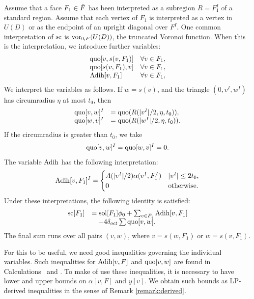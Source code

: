 Assume that a face $F_1\in \tildeF$ has been interpreted as a
subregion $R=F_1^I$ of a standard region.  Assume that each vertex
of $F_1$ is interpreted as a vertex in $U(D)$ or as the endpoint
of an upright diagonal over $F^I$.  One common interpretation of
$\sc$ is $\vor_{0,F}(U(D))$, the truncated Voronoi function. When
this is the interpretation, we introduce further variables:
    $$
    \begin{array}{lll}
    \quo[v,s(v,F_1)] & \forall v\in F_1,\\
    \quo[s(v,F_1),v] & \forall v\in F_1,\\
    \Adih[v,F_1] & \forall v\in F_1,\\
    \end{array}
    $$
We interpret the variables as follows. If $w = s(v)$, and the
triangle $(0,v^I,w^I)$ has circumradius $\eta$ at most $t_0$, then
    $$
    \begin{array}{lll}
    \quo[v,w]^I &= \quo(R(|v^I|/2,\eta,t_0)),\\
    \quo[w,v]^I &= \quo(R(|w^I|/2,\eta,t_0)).
    \end{array}
    $$
If the circumradius is greater than $t_0$, we take
    $$\quo[v,w]^I =\quo[w,v]^I =0.$$
The variable $\Adih$ has the following interpretation:
    $$\Adih[v,F_1]^I = \begin{cases}
        A(|v^I|/2)\alpha(v^I,F_1^I) & |v^I|\le 2t_0,\\
        0 & \text{otherwise.}\\
        \end{cases}
    $$
Under these interpretations, the following identity is satisfied:
    $$
    \begin{array}{lll}
    \sc[F_1] &= \sol[F_1]\phi_0 +\sum_{v\in F_1} \Adih[v,F_1]\\
            &\quad - 4\doct \sum \quo[v,w].
    \end{array}
    $$
The final sum runs over all pairs
$(v,w)$, where $v=s(w,F_1)$ or $w=s(v,F_1)$.

For this to be useful, we need good inequalities governing the
individual variables.  Such inequalities for $\Adih[v,F]$ and
$\quo[v,w]$ are found in Calculations~ and
. To make of use these inequalities, it is
necessary to have lower and upper bounds on $\alpha[v,F]$ and
$y[v]$.  We obtain such bounds as LP-derived inequalities in the
sense of Remark \ref{remark:derived}.


